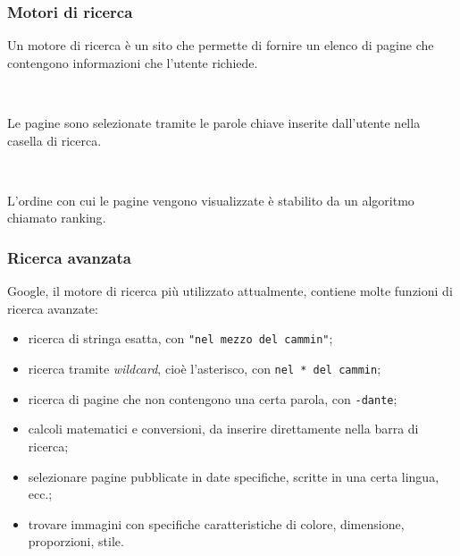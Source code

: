 \documentclass[handout]{beamer}
\begin{document}
\begin{frame}
\frametitle{Motori di ricerca}
Un motore di ricerca è un sito che permette di fornire un \alert<1>{elenco di pagine} che contengono informazioni che l'utente richiede.\pause

~

Le pagine sono selezionate tramite le \alert<2>{parole chiave} inserite dall'utente nella \alert<2>{casella di ricerca}.\pause

~

L'ordine con cui le pagine vengono visualizzate è stabilito da un algoritmo chiamato \alert<3>{ranking}.
\end{frame}



\begin{frame}
\frametitle{Ricerca avanzata}
Google, il motore di ricerca più utilizzato attualmente, contiene molte funzioni di ricerca avanzate:\pause
\begin{itemize}
  \item ricerca di stringa esatta, con \texttt{"nel mezzo del cammin"};\pause
  \item ricerca tramite \emph{wildcard}, cioè l'asterisco, con \texttt{nel * del cammin};\pause
  \item ricerca di pagine che non contengono una certa parola, con \texttt{-dante};\pause
  \item calcoli matematici e conversioni, da inserire direttamente nella barra di ricerca;\pause
  \item selezionare pagine pubblicate in date specifiche, scritte in una certa lingua, ecc.;\pause
  \item trovare immagini con specifiche caratteristiche di colore, dimensione, proporzioni, stile. 
\end{itemize}
\end{frame}
\end{document}
